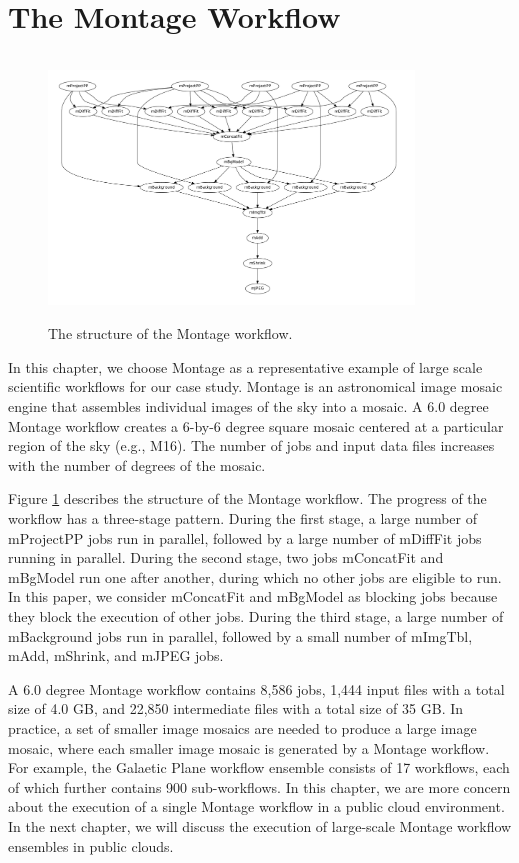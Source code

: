 \section{The Montage Workflow}
\label{v1_sec:montage}


\begin{figure}[!t]
	\centering
	\hspace{-10pt}
	\includegraphics[width=9.7cm, height=7cm]{montage}
    \caption{The structure of the Montage workflow.}
    \vspace{-10pt}
	\label{v1_fig:montage}
\end{figure}


In this chapter, we choose Montage as a representative example of large scale scientific workflows for our case study. Montage is an astronomical image mosaic engine that assembles individual images of the sky into a mosaic. A 6.0 degree Montage workflow creates a 6-by-6 degree square mosaic centered at a particular region of the sky (e.g., M16). The number of jobs and input data files increases with the number of degrees of the mosaic. 

Figure \ref{v1_fig:montage} describes the structure of the Montage workflow. The progress of the workflow has a three-stage pattern. During the first stage, a large number of mProjectPP jobs run in parallel, followed by a large number of mDiffFit jobs running in parallel. During the second stage, two jobs mConcatFit and mBgModel run one after another, during which no other jobs are eligible to run. In this paper, we consider mConcatFit and mBgModel as blocking jobs because they block the execution of other jobs. During the third stage, a large number of mBackground jobs run in parallel, followed by a small number of mImgTbl, mAdd, mShrink, and mJPEG jobs.

A 6.0 degree Montage workflow contains 8,586 jobs, 1,444 input files with a total size of 4.0 GB, and 22,850 intermediate files with a total size of 35 GB. In practice, a set of smaller image mosaics are needed to produce a large image mosaic, where each smaller image mosaic is generated by a Montage workflow. For example, the Galaetic Plane workflow ensemble \cite{deelman2013hosted} consists of 17 workflows, each of which further contains 900 sub-workflows. In this chapter, we are more concern about the execution of a single Montage workflow in a public cloud environment. In the next chapter, we will discuss the execution of large-scale Montage workflow ensembles in public clouds.


